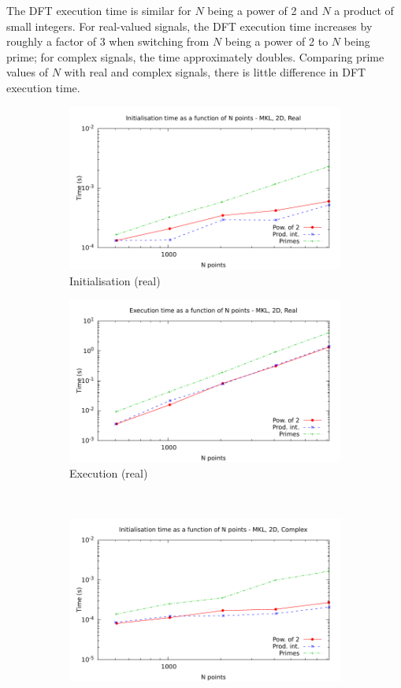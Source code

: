 \documentclass[12pt, a4paper]{article} \setlength{\textheight}{24cm}
\begin{document}
The DFT execution time is similar for $N$ being a power of 2 and $N$ a
product of small integers. For real-valued signals, the DFT execution
time increases by roughly a factor of 3 when switching from $N$ being
a power of 2 to $N$ being prime; for complex signals, the time
approximately doubles. Comparing prime values of $N$ with real and
complex signals, there is little difference in DFT execution time.

\begin{figure}[H]
  \centering
  \begin{subfigure}{.5\textwidth}
    \centering
    \includegraphics[width=.9\linewidth]{graphs/2d-mkl-init-r.pdf}
    \caption{Initialisation (real)}
    \label{2DMKLRI}
  \end{subfigure}%
  \begin{subfigure}{.5\textwidth}
    \centering
    \includegraphics[width=.9\linewidth]{graphs/2d-mkl-exec-r.pdf}
    \caption{Execution (real)}
    \label{2DMKLR}
  \end{subfigure}\\
  \begin{subfigure}{.5\textwidth}
    \centering
    \includegraphics[width=.9\linewidth]{graphs/2d-mkl-init-c.pdf}

\end{subfigure}
\end{figure}
\end{document}
